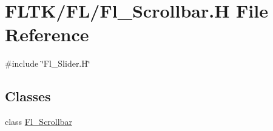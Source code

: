 \hypertarget{_fl___scrollbar_8_h}{}\section{F\+L\+T\+K/\+F\+L/\+Fl\+\_\+\+Scrollbar.H File Reference}
\label{_fl___scrollbar_8_h}
{\ttfamily \#include \char`\"{}Fl\+\_\+\+Slider.\+H\char`\"{}}\newline
\subsection*{Classes}
\begin{DoxyCompactItemize}
\item 
class \hyperlink{class_fl___scrollbar}{Fl\+\_\+\+Scrollbar}
\end{DoxyCompactItemize}
